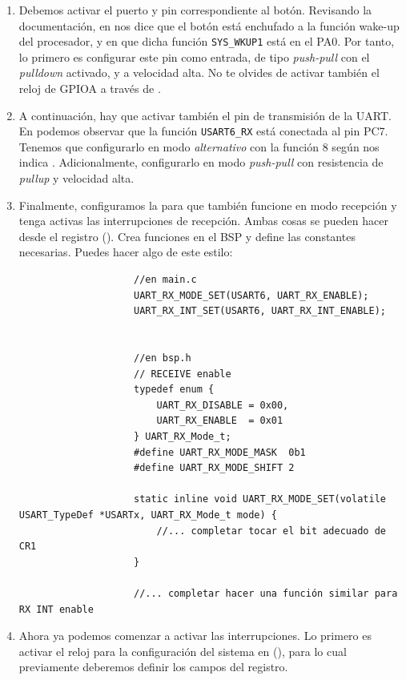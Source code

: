 \documentclass[../main.tex]{subfiles}
\begin{document}
\begin{enumerate}
            \item Debemos activar el puerto y pin correspondiente al botón. Revisando la documentación, en \BRDMAN[Table 5] nos dice que el botón está enchufado a la función wake-up del procesador, y en \BRDMAN[Table 19] que dicha función \texttt{SYS\_WKUP1} está en el PA0. Por tanto, lo primero es configurar este pin como entrada, de tipo \emph{push-pull} con el \emph{pulldown} activado, y a velocidad alta. No te olvides de activar también el reloj de GPIOA a través de .
            \item A continuación, hay que activar también el pin de transmisión de la UART. En \BRDMAN[Table 19] podemos observar que la función \texttt{USART6\_RX} está conectada al pin PC7. Tenemos que configurarlo en modo \emph{alternativo} con la función 8 según nos indica \DSMAN[Table 12]. Adicionalmente, configurarlo en modo \emph{push-pull} con resistencia de \emph{pullup} y velocidad alta.
            \item Finalmente, configuramos la  para que también funcione en modo recepción y tenga activas las interrupciones de recepción. Ambas cosas se pueden hacer desde el registro  (\REFMAN[27.8.1]). Crea funciones en el BSP y define las constantes necesarias. Puedes hacer algo de este estilo:
            
                \begin{lstlisting}
                    //en main.c
                    UART_RX_MODE_SET(USART6, UART_RX_ENABLE);
	                UART_RX_INT_SET(USART6, UART_RX_INT_ENABLE);    


                    //en bsp.h
                    // RECEIVE enable
                    typedef enum {
                        UART_RX_DISABLE = 0x00,
                        UART_RX_ENABLE  = 0x01
                    } UART_RX_Mode_t;
                    #define UART_RX_MODE_MASK  0b1
                    #define UART_RX_MODE_SHIFT 2

                    static inline void UART_RX_MODE_SET(volatile USART_TypeDef *USARTx, UART_RX_Mode_t mode) {
                        //... completar tocar el bit adecuado de CR1
                    }

                    //... completar hacer una función similar para RX INT enable
                \end{lstlisting}
            	
            \item Ahora ya podemos comenzar a activar las interrupciones. Lo primero es activar el reloj para la configuración del sistema en  (\REFMAN[5.3.14]), para lo cual previamente deberemos definir los campos del registro.
            

\end{enumerate}
\end{document}
